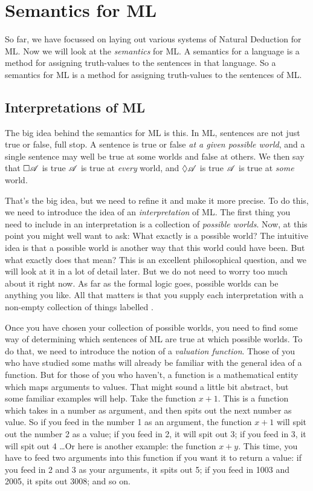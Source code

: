 \chapter{Semantics for ML}
\label{Semantics}

So far, we have focussed on laying out various systems of Natural Deduction for ML. Now we will look at the \emph{semantics} for ML. A semantics for a language is a method for assigning truth-values to the sentences in that language. So a semantics for ML is a method for assigning truth-values to the sentences of ML.

\section{Interpretations of ML}

The big idea behind the semantics for ML is this. In ML, sentences are not just true or false, full stop. A sentence is true or false \emph{at a given possible world}, and a single sentence may well be true at some worlds and false at others. We then say that $\Box \mathscr{A}$ is true \ifeff{} $\mathscr{A}$ is true at \emph{every} world, and $\Diamond\mathscr{A}$ is true \ifeff{} $\mathscr{A}$ is true at \emph{some} world.

That's the big idea, but we need to refine it and make it more precise. To do this, we need to introduce the idea of an \emph{interpretation} of ML. The first thing you need to include in an interpretation is a collection of \emph{possible worlds}. Now, at this point you might well want to ask: What exactly is a possible world? The intuitive idea is that a possible world is another way that this world could have been. But what exactly does that mean? This is an excellent philosophical question, and we will look at it in a lot of detail later. But we do not need to worry too much about it right now. As far as the formal logic goes, possible worlds can be anything you like. All that matters is that you supply each interpretation with a non-empty collection of things labelled .

Once you have chosen your collection of possible worlds, you need to find some way of determining which sentences of ML are true at which possible worlds. To do that, we need to introduce the notion of a \emph{valuation function}. Those of you who have studied some maths will already be familiar with the general idea of a function. But for those of you who haven't, a function is a mathematical entity which maps arguments to values. That might sound a little bit abstract, but some familiar examples will help. Take the function $x+1$. This is a function which takes in a number as argument, and then spits out the next number as value. So if you feed in the number 1 as an argument, the function $x+1$ will spit out the number 2 as a value; if you feed in 2, it will spit out 3; if you feed in 3, it will spit out 4 \dots  Or here is another example: the function $x+y$. This time, you have to feed two arguments into this function if you want it to return a value: if you feed in 2 and 3 as your arguments, it spits out 5; if you feed in 1003 and 2005, it spits out 3008; and so on.

